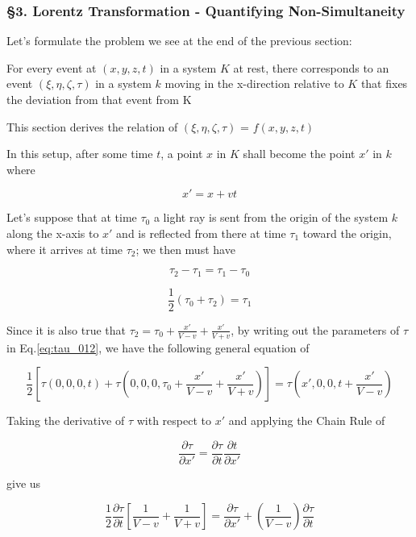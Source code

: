 \subsubsection{\hfil \S3. Lorentz Transformation - Quantifying Non-Simultaneity \hfil}

Let's formulate the problem we see at the end of the previous section:

For every event at $(x, y, z, t)$ in a system $K$ at rest, there corresponds to an event $(\xi, \eta, \zeta, \tau)$ in
a system $k$ moving in the x-direction relative to $K$ that fixes the deviation from that event from K

This section derives the relation of $(\xi, \eta, \zeta, \tau)$ = $f(x, y, z, t)$

In this setup, after some time $t$, a point $x$ in $K$ shall become the point $x'$ in $k$ where

\[
    x' = x + vt
\]

Let's suppose that at time $\tau_0$ a light ray is sent from the origin of the system $k$ along the x-axis to $x'$ and
is reflected from there at time $\tau_1$ toward the origin, where it arrives at time $\tau_2$; we then must have

\[
    \tau_2 - \tau_1 = \tau_1 - \tau_0
\]

\begin{equation} \label{eq:tau_012}
    \frac{1}{2}(\tau_0 + \tau_2) = \tau_1
\end{equation}

Since it is also true that $\tau_2 = \tau_0 + \frac{x'}{V - v} + \frac{x'}{V + v}$, by writing out the parameters of
$\tau$ in Eq.\ref{eq:tau_012}, we have the following general equation of

\begin{equation}
    \frac{1}{2}\left[ \tau(0, 0, 0, t) + \tau\left( 0, 0, 0, \tau_0 + \frac{x'}{V - v} + \frac{x'}{V + v} \right) \right] = \tau\left( x', 0, 0, t + \frac{x'}{V -v} \right)
\end{equation}

Taking the derivative of $\tau$ with respect to $x'$ and applying the Chain Rule of

\[
    \frac{\partial\tau}{\partial x'} = \frac{\partial\tau}{\partial t}\frac{\partial t}{\partial x'}
\]

give us

\begin{equation}
    \frac{1}{2}\frac{\partial\tau}{\partial t}\left[ \frac{1}{V - v} + \frac{1}{V + v} \right] = \frac{\partial\tau}{\partial x'} + \left( \frac{1}{V - v} \right)\frac{\partial\tau}{\partial t}
\end{equation}

